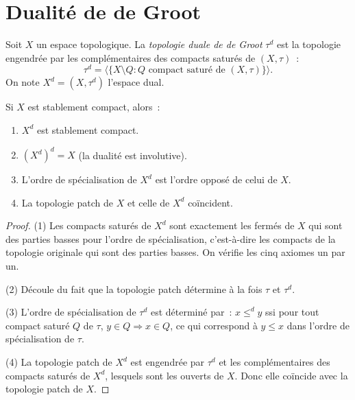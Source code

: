 \section{Dualit\'e de de Groot}

\begin{definition}
Soit $X$ un espace topologique. La \emph{topologie duale de de Groot} $\tau^d$ est la
topologie engendr\'ee par les compl\'ementaires des compacts satur\'es de $(X,\tau)$~:
\[
  \tau^d = \langle \{ X \setminus Q : Q \text{ compact satur\'e de } (X,\tau) \} \rangle.
\]
On note $X^d = (X, \tau^d)$ l'espace dual.
\end{definition}

\begin{theoreme}
\label{thm:de-groot}
Si $X$ est stablement compact, alors~:
\begin{enumerate}
  \item $X^d$ est stablement compact.
  \item $(X^d)^d = X$ (la dualit\'e est involutive).
  \item L'ordre de sp\'ecialisation de $X^d$ est l'ordre oppos\'e de celui de $X$.
  \item La topologie patch de $X$ et celle de $X^d$ co\"incident.
\end{enumerate}
\end{theoreme}

\begin{proof}
(1) Les compacts satur\'es de $X^d$ sont exactement les ferm\'es de $X$ qui sont des
parties basses pour l'ordre de sp\'ecialisation, c'est-\`a-dire les compacts de la topologie
originale qui sont des parties basses. On v\'erifie les cinq axiomes un par un.

(2) D\'ecoule du fait que la topologie patch d\'etermine \`a la fois $\tau$ et $\tau^d$.

(3) L'ordre de sp\'ecialisation de $\tau^d$ est d\'etermin\'e par~: $x \leq^d y$ ssi pour
tout compact satur\'e $Q$ de $\tau$, $y \in Q \Rightarrow x \in Q$, ce qui correspond
\`a $y \leq x$ dans l'ordre de sp\'ecialisation de $\tau$.

(4) La topologie patch de $X^d$ est engendr\'ee par $\tau^d$ et les compl\'ementaires
des compacts satur\'es de $X^d$, lesquels sont les ouverts de $X$. Donc elle co\"incide
avec la topologie patch de $X$.
\end{proof}

